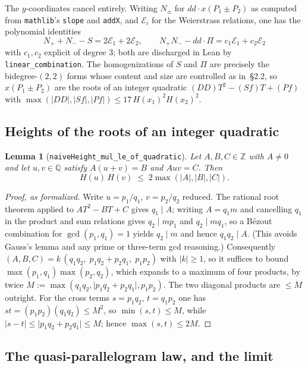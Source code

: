\documentclass[11pt,reqno]{amsart}
\theoremstyle{plain}
\newtheorem{lemma}[theorem]{Lemma}
\theoremstyle{definition}
\theoremstyle{remark}
\DeclareRobustCommand{\lt}[1]{\texttt{#1}}
\newcommand{\nh}{H}
\begin{document}
The $y$-coordinates cancel entirely. Writing
$N_\pm$ for $dd \cdot x(P_1 \pm P_2)$ as computed from
\texttt{mathlib}'s \lt{slope} and \lt{addX}, and $\mathcal{E}_i$ for the
Weierstrass relations, one has the polynomial identities
\[
  N_+ + N_- - S = 2\mathcal{E}_1 + 2\mathcal{E}_2, \qquad
  N_+ N_- - dd \cdot \Pi = c_1\mathcal{E}_1 + c_2\mathcal{E}_2
\]
with $c_1, c_2$ explicit of degree $3$; both are discharged in Lean by
\lt{linear\_combination}. The homogenizations of $S$ and $\Pi$ are precisely
the bidegree-$(2,2)$ forms whose content and size are controlled as
in~\S2.2, so $x(P_1 \pm P_2)$ are the roots of an integer quadratic
$(DD)T^2 - (Sf)T + (Pf)$ with $\max(\lvert DD\rvert, \lvert Sf\rvert,
\lvert Pf\rvert) \le 17\,\nh(x_1)^2\nh(x_2)^2$.

\subsection{Heights of the roots of an integer quadratic}

\begin{lemma}[\lt{naiveHeight\_mul\_le\_of\_quadratic}]\label{lem:roots}
Let $A,B,C \in \mathbb{Z}$ with $A \ne 0$ and let $u,v \in \mathbb{Q}$
satisfy $A(u+v) = B$ and $Auv = C$. Then
\[
  \nh(u)\,\nh(v) \;\le\; 2\max(\lvert A\rvert, \lvert B\rvert,
  \lvert C\rvert).
\]
\end{lemma}

\begin{proof}[Proof, as formalized]
Write $u = p_1/q_1$, $v = p_2/q_2$ reduced. The rational root theorem applied
to $AT^2 - BT + C$ gives $q_1 \mid A$; writing $A = q_1 m$ and cancelling
$q_1$ in the product and sum relations gives $q_2 \mid m p_1$ and
$q_2 \mid m q_1$, so a B\'ezout combination for $\gcd(p_1,q_1) = 1$ yields
$q_2 \mid m$ and hence $q_1q_2 \mid A$. (This avoids Gauss's lemma and any
prime or three-term gcd reasoning.) Consequently
$(A,B,C) = k\,(q_1q_2,\; p_1q_2 + p_2q_1,\; p_1p_2)$ with $\lvert k\rvert
\ge 1$, so it suffices to bound
$\max(p_1,q_1)\max(p_2,q_2)$, which expands to a maximum of four products,
by twice $M := \max(q_1q_2, \lvert p_1q_2+p_2q_1\rvert, p_1p_2)$. The two
diagonal products are $\le M$ outright. For the cross terms $s = p_1q_2$,
$t = q_1p_2$ one has $st = (p_1p_2)(q_1q_2) \le M^2$, so
$\min(s,t) \le M$, while $\lvert s - t\rvert \le \lvert p_1q_2 +
p_2q_1\rvert \le M$; hence $\max(s,t) \le 2M$.
\end{proof}

\subsection{The quasi-parallelogram law, and the limit}
\end{document}
